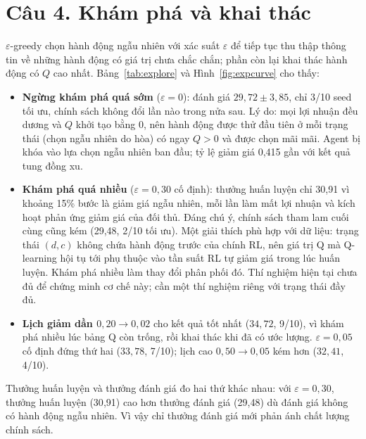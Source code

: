 \documentclass[12pt,a4paper]{report}
\begin{document}
\section*{Câu 4. Khám phá và khai thác}
$\varepsilon$-greedy chọn hành động ngẫu nhiên với xác suất $\varepsilon$ để tiếp
tục thu thập thông tin về những hành động có giá trị chưa chắc chắn; phần còn lại
khai thác hành động có $Q$ cao nhất. Bảng~\ref{tab:explore} và
Hình~\ref{fig:expcurve} cho thấy:
\begin{itemize}
\item \textbf{Ngừng khám phá quá sớm} ($\varepsilon=0$): đánh giá $29{,}72\pm3{,}85$,
  chỉ 3/10 seed tối ưu, chính sách không đổi lần nào trong nửa sau. Lý do: mọi
  lợi nhuận đều dương và $Q$ khởi tạo bằng 0, nên hành động được thử đầu tiên ở mỗi
  trạng thái (chọn ngẫu nhiên do hòa) có ngay $Q>0$ và được chọn mãi mãi. Agent bị
  khóa vào lựa chọn ngẫu nhiên ban đầu; tỷ lệ giảm giá 0{,}415 gần với kết quả tung
  đồng xu.
\item \textbf{Khám phá quá nhiều} ($\varepsilon=0{,}30$ cố định): thưởng huấn luyện
  chỉ 30{,}91 vì khoảng 15\% bước là giảm giá ngẫu nhiên, mỗi lần làm mất lợi nhuận
  và kích hoạt phản ứng giảm giá của đối thủ. Đáng chú ý, chính sách tham lam cuối
  cùng cũng kém (29{,}48, 2/10 tối ưu). Một giải thích phù hợp với dữ liệu: trạng
  thái $(d,c)$ không chứa hành động trước của chính RL, nên giá trị Q mà Q-learning
  hội tụ tới phụ thuộc vào tần suất RL tự giảm giá trong lúc huấn luyện. Khám phá
  nhiều làm thay đổi phân phối đó. Thí nghiệm hiện tại chưa đủ để chứng minh cơ chế
  này; cần một thí nghiệm riêng với trạng thái đầy đủ.
\item \textbf{Lịch giảm dần $0{,}20\to0{,}02$} cho kết quả tốt nhất ($34{,}72$,
  9/10), vì khám phá nhiều lúc bảng Q còn trống, rồi khai thác khi đã có ước lượng.
  $\varepsilon=0{,}05$ cố định đứng thứ hai ($33{,}78$, 7/10); lịch cao
  $0{,}50\to0{,}05$ kém hơn ($32{,}41$, 4/10).
\end{itemize}
Thưởng huấn luyện và thưởng đánh giá đo hai thứ khác nhau: với $\varepsilon=0{,}30$,
thưởng huấn luyện (30{,}91) cao hơn thưởng đánh giá (29{,}48) dù đánh giá không có
hành động ngẫu nhiên. Vì vậy chỉ thưởng đánh giá mới phản ánh chất lượng chính sách.

\end{document}
